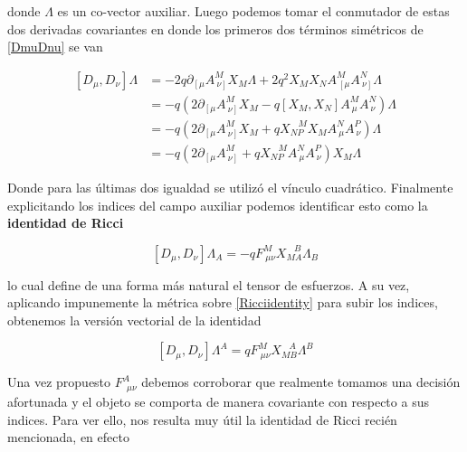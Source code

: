 \documentclass{article}
\numberwithin{equation}{section}
\begin{document}
donde $ \Lambda $ es un co-vector auxiliar. Luego podemos tomar el conmutador de estas dos derivadas covariantes en donde los primeros dos términos simétricos de \ref{DmuDnu} se van

\begin{equation}
\begin{aligned}
\left[D_{\mu}, D_{\nu}\right] \Lambda &= -2 q  \partial_{\left[ \mu\right.} A^M_{\ \left. \nu \right]} X_M \Lambda + 2 q^2 X_M X_N A^M_{\ \left[ \mu \right.} A^N_{\ \left. \nu\right]} \Lambda\\
&= -q \left( 2 \partial_{\left[ \mu\right.} A^M_{\ \left. \nu \right]} X_M  - q \left[X_M, X_N\right] A^M_{\ \mu} A^N_{\ \nu} \right) \Lambda\\
&= -q \left( 2 \partial_{\left[ \mu\right.} A^M_{\ \left. \nu \right]} X_M + q X_{N P}^{\ \ \ \ M} X_M A^N_{\ \mu} A^P_{\ \nu} \right)  \Lambda\\
&=-q \left( 2 \partial_{\left[ \mu\right.} A^M_{\ \left. \nu \right]} + q X_{N P}^{\ \ \ \ M}  A^N_{\ \mu} A^P_{\ \nu} \right) X_M \Lambda
\end{aligned}
\end{equation}

Donde para las últimas dos igualdad se utilizó el vínculo cuadrático. Finalmente explicitando los indices del campo auxiliar podemos identificar esto como la \textbf{identidad de Ricci}

\begin{boxquation}
	\begin{equation}\label{Ricciidentity}
	\left[D_{\mu}, D_{\nu}\right] \Lambda_A = -q F^M_{\ \mu \nu} X_{M A}^{\ \ \ \ B} \Lambda_B 
	\end{equation}
\end{boxquation}

lo cual define de una forma más natural el tensor de esfuerzos. A su vez, aplicando impunemente la métrica sobre \ref{Ricciidentity} para subir los indices, obtenemos la versión vectorial de la identidad

\begin{equation}\label{Ricciidentityvectorial}
\left[D_{\mu}, D_{\nu}\right] \Lambda^A = q F^M_{\ \mu \nu} X_{M B}^{\ \ \ \ A} \Lambda^B
\end{equation}

Una vez propuesto $ F^A_{\ \  \mu \nu} $ debemos corroborar que realmente tomamos una decisión afortunada y el objeto se comporta de manera covariante con respecto a sus indices. Para ver ello, nos resulta muy útil la identidad de Ricci recién mencionada, en efecto
\end{document}
